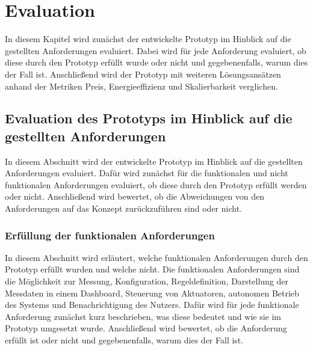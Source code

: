 \chapter{Evaluation}\label{ch:evaluation}
In diesem Kapitel wird zunächst der entwickelte Prototyp im Hinblick auf die gestellten Anforderungen evaluiert.
Dabei wird für jede Anforderung evaluiert, ob diese durch den Prototyp erfüllt wurde oder nicht und gegebenenfalls, warum dies der Fall ist.
Anschließend wird der Prototyp mit weiteren Lösungsansätzen anhand der Metriken Preis, Energieeffizienz und Skalierbarkeit verglichen.



\section{Evaluation des Prototyps im Hinblick auf die gestellten Anforderungen}
In diesem Abschnitt wird der entwickelte Prototyp im Hinblick auf die gestellten Anforderungen evaluiert.
Dafür wird zunächst für die funktionalen und nicht funktionalen Anforderungen evaluiert, ob diese durch den Prototyp erfüllt werden oder nicht.
Anschließend wird bewertet, ob die Abweichungen von den Anforderungen auf das Konzept zurückzuführen sind oder nicht.


\subsection{Erfüllung der funktionalen Anforderungen}
In diesem Abschnitt wird erläutert, welche funktionalen Anforderungen durch den Prototyp erfüllt wurden und welche nicht.
Die funktionalen Anforderungen sind die Möglichkeit zur Messung, Konfiguration, Regeldefinition, Darstellung der Messdaten in einem Dashboard, Steuerung von Aktuatoren, autonomen Betrieb des Systems und Benachrichtigung des Nutzers.
Dafür wird für jede funktionale Anforderung zunächst kurz beschrieben, was diese bedeutet und wie sie im Prototyp umgesetzt wurde.
Anschließend wird bewertet, ob die Anforderung erfüllt ist oder nicht und gegebenenfalls, warum dies der Fall ist.

